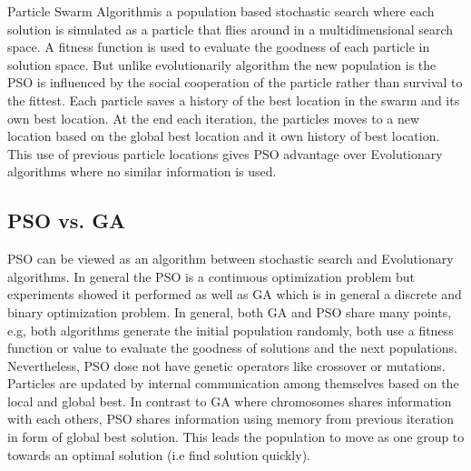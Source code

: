  Particle Swarm Algorithm\cite{PSOFirst}is a population based stochastic search where each solution is simulated as a  particle that flies around in a multidimensional search space. A fitness function is used to evaluate the goodness of each particle in solution space. But unlike evolutionarily algorithm the new population is the PSO is influenced by the social cooperation of the particle rather than survival to the fittest. Each particle saves a history of the best location in the swarm and its own best location.  At the end each iteration, the particles moves to a new location based on the global best location and it own history of best location. This use of previous particle locations gives PSO advantage over Evolutionary algorithms where no similar information is used. 
 
\subsection{PSO vs. GA}
 PSO can be viewed as an algorithm between stochastic search and Evolutionary algorithms\cite{PSOpattern}. In general the PSO is a continuous optimization problem but experiments showed it performed as well as GA which is in general a discrete and binary optimization problem. In general, both GA and PSO share many points, e.g, both algorithms generate the initial population randomly, both use a fitness function or value to evaluate the goodness of solutions and the next populations. Nevertheless, PSO dose not have genetic operators like crossover or mutations. Particles are updated by internal communication among themselves based on the local and global best. In contrast to GA where chromosomes shares information with each others, PSO shares information using memory from previous iteration in form of global best solution. This leads the population to move as one group to towards an optimal solution (i.e find solution quickly). %
 


